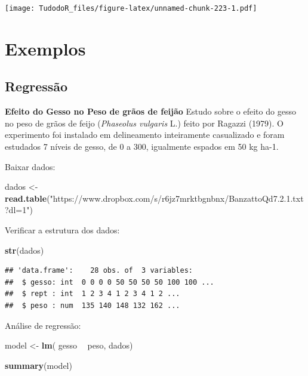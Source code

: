 \documentclass[
]{book}
\newenvironment{Shaded}{\begin{snugshade}}{\end{snugshade}}
\newcommand{\KeywordTok}[1]{\textcolor[rgb]{0.13,0.29,0.53}{\textbf{#1}}}
\newcommand{\NormalTok}[1]{#1}
\newcommand{\OperatorTok}[1]{\textcolor[rgb]{0.81,0.36,0.00}{\textbf{#1}}}
\newcommand{\StringTok}[1]{\textcolor[rgb]{0.31,0.60,0.02}{#1}}
\begin{document}
\texttt{[image: TudodoR\_files/figure-latex/unnamed-chunk-223-1.pdf]}

\hypertarget{exemplos}{%
\section{Exemplos}\label{exemplos}}

\hypertarget{regressuxe3o}{%
\subsection{Regressão}\label{regressuxe3o}}

\textbf{Efeito do Gesso no Peso de grãos de feijão}
Estudo sobre o efeito do gesso no peso de grãos de feijo (\emph{Phaseolus vulgaris} L.) feito por Ragazzi (1979). O experimento foi instalado em delineamento inteiramente casualizado e foram estudados 7 níveis de gesso, de 0 a 300, igualmente espados em 50 kg ha-1.

Baixar dados:

\begin{Shaded}
\begin{Highlighting}[]
\NormalTok{dados <-}\StringTok{ }\KeywordTok{read.table}\NormalTok{(}\StringTok{"https://www.dropbox.com/s/r6jz7mrktbgnbnx/BanzattoQd7.2.1.txt?dl=1"}\NormalTok{)}
\end{Highlighting}
\end{Shaded}

Verificar a estrutura dos dados:

\begin{Shaded}
\begin{Highlighting}[]
\KeywordTok{str}\NormalTok{(dados)}
\end{Highlighting}
\end{Shaded}

\begin{verbatim}
## 'data.frame':    28 obs. of  3 variables:
##  $ gesso: int  0 0 0 0 50 50 50 50 100 100 ...
##  $ rept : int  1 2 3 4 1 2 3 4 1 2 ...
##  $ peso : num  135 140 148 132 162 ...
\end{verbatim}

Análise de regressão:

\begin{Shaded}
\begin{Highlighting}[]
\NormalTok{model <-}\StringTok{ }\KeywordTok{lm}\NormalTok{(  gesso }\OperatorTok{~}\StringTok{ }\NormalTok{peso, dados)}

\KeywordTok{summary}\NormalTok{(model)}
\end{Highlighting}
\end{Shaded}
\end{document}

